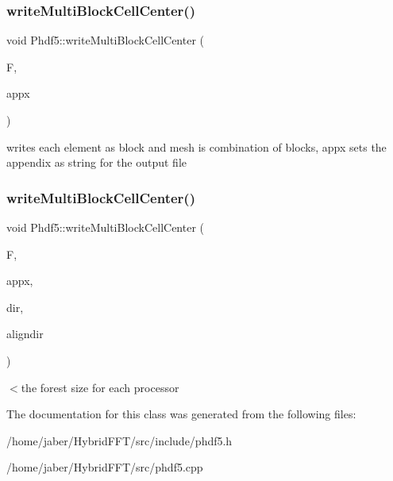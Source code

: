 \subsubsection{\texorpdfstring{write\+Multi\+Block\+Cell\+Center()}{writeMultiBlockCellCenter()}\hspace{0.1cm}{\footnotesize\ttfamily [1/2]}}
{\footnotesize\ttfamily void Phdf5\+::write\+Multi\+Block\+Cell\+Center (\begin{DoxyParamCaption}\item[{\mbox{\hyperlink{classChunkedArray}{Chunked\+Array}} \&}]{F,  }\item[{uint}]{appx }\end{DoxyParamCaption})}

writes each element as block and mesh is combination of blocks, appx sets the appendix as string for the output file \mbox{\label{classPhdf5_aa538a38bccf577015df490e3e2371445}} 
\subsubsection{\texorpdfstring{write\+Multi\+Block\+Cell\+Center()}{writeMultiBlockCellCenter()}\hspace{0.1cm}{\footnotesize\ttfamily [2/2]}}
{\footnotesize\ttfamily void Phdf5\+::write\+Multi\+Block\+Cell\+Center (\begin{DoxyParamCaption}\item[{\mbox{\hyperlink{classChunkedArray}{Chunked\+Array}} \&}]{F,  }\item[{uint}]{appx,  }\item[{int}]{dir,  }\item[{int}]{aligndir }\end{DoxyParamCaption})}

$<$the forest size for each processor 

The documentation for this class was generated from the following files\+:\begin{DoxyCompactItemize}
\item 
/home/jaber/\+Hybrid\+F\+F\+T/src/include/phdf5.\+h\item 
/home/jaber/\+Hybrid\+F\+F\+T/src/phdf5.\+cpp\end{DoxyCompactItemize}
